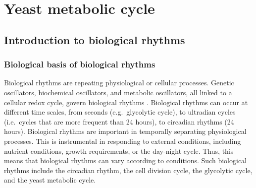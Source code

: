 \section{Yeast metabolic cycle}
\label{sec:intro-ymc}

\subsection{Introduction to biological rhythms}
\label{subsec:intro-ymc-biological_rhythms}

\subsubsection{Biological basis of biological rhythms}
\label{subsubsec:intro-ymc-biological_rhythms-biological_basis}


Biological rhythms are repeating physiological or cellular processes.
Genetic oscillators, biochemical oscillators, and metabolic oscillators, all linked to a cellular redox cycle, govern biological rhythms \parencite{mellorMolecularBasisMetabolic2016}.
Biological rhythms can occur at different time scales, from seconds (e.g.\ glycolytic cycle), to ultradian cycles (i.e.\ cycles that are more frequent than 24 hours), to circadian rhythms (24 hours).
Biological rhythms are important in temporally separating physiological processes.
This is instrumental in responding to external conditions, including nutrient conditions, growth requirements, or the day-night cycle.
Thus, this means that biological rhythms can vary according to conditions.
Such biological rhythms include the circadian rhythm, the cell division cycle, the glycolytic cycle, and the yeast metabolic cycle.

